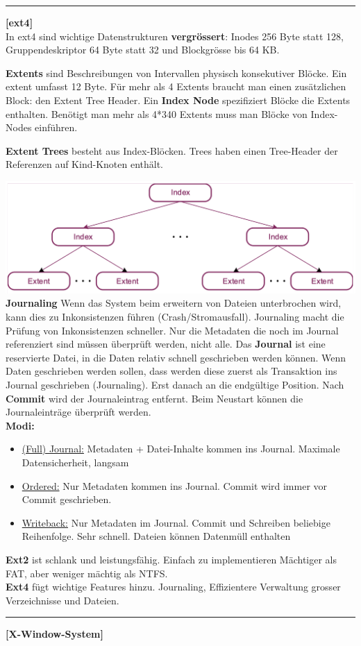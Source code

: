 \documentclass[8pt]{extarticle}
\let\oldtextbf\textbf
\renewcommand{\textbf}{\tiny\oldtextbf}
\begin{document}
\begin{multicols*}{5}
	\vspace{5pt}
	\rule{\linewidth}{0.4pt}
	\textbf{[ext4]}\\
	
	In ext4 sind wichtige Datenstrukturen \textbf{vergrössert}: Inodes 256 Byte statt 128, Gruppendeskriptor 64 Byte statt 32 und Blockgrösse bis 64 KB.
	
	\textbf{Extents} sind Beschreibungen von Intervallen physisch konsekutiver Blöcke. Ein extent umfasst 12 Byte. Für mehr als 4 Extents braucht man einen zusätzlichen Block: den Extent Tree Header.
	Ein \textbf{Index Node} spezifiziert Blöcke die Extents enthalten. Benötigt man mehr als 4*340 Extents muss man Blöcke von Index-Nodes einführen.
	
	\textbf{Extent Trees} besteht aus Index-Blöcken. Trees haben einen Tree-Header der Referenzen auf Kind-Knoten enthält.
	
	\includegraphics[scale=0.22]{Extent-Trees.png} %
	\vspace{5pt}\\
	\textbf{Journaling} Wenn das System beim erweitern von Dateien unterbrochen wird, kann dies zu Inkonsistenzen führen (Crash/Stromausfall). Journaling macht die Prüfung von Inkonsistenzen schneller. Nur die Metadaten die noch im Journal referenziert sind müssen überprüft werden, nicht alle.
	Das \textbf{Journal} ist eine reservierte Datei, in die Daten relativ schnell geschrieben werden können. Wenn Daten geschrieben werden sollen, dass werden diese zuerst als Transaktion ins Journal geschrieben (Journaling). Erst danach an die endgültige Position. Nach \textbf{Commit} wird der Journaleintrag entfernt. Beim Neustart können die Journaleinträge überprüft werden.\\
	\textbf{Modi:}
	\begin{itemize} [noitemsep, topsep=0pt, leftmargin=*]
		\item \underline{(Full) Journal:} Metadaten + Datei-Inhalte kommen ins Journal. Maximale Datensicherheit, langsam
		\item \underline{Ordered:} Nur Metadaten kommen ins Journal. Commit wird immer vor Commit geschrieben.
		\item \underline{Writeback:} Nur Metadaten im Journal. Commit und Schreiben beliebige Reihenfolge. Sehr schnell. Dateien können Datenmüll enthalten
	\end{itemize}
	\textbf{Ext2} ist schlank und leistungsfähig. Einfach zu implementieren Mächtiger als FAT, aber weniger mächtig als NTFS.\\
	\textbf{Ext4} fügt wichtige Features hinzu. Journaling, Effizientere Verwaltung grosser Verzeichnisse und Dateien.
	
	\vspace{5pt}
	\rule{\linewidth}{0.4pt}
	\textbf{[X-Window-System]}\\
\end{multicols*}
\end{document}
